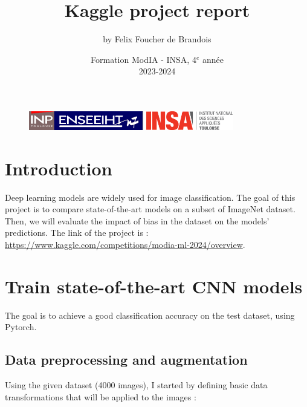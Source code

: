 \documentclass[12pt,a4paper]{article}
\begin{document}
\begin{figure}[ht]
    \centering
    \includegraphics[width=5cm]{src/inp_n7.png}
    \hfill
    \includegraphics[width=3.8cm]{src/insa_toulouse.png}
\end{figure}

\title{\vspace{4cm} \textbf{Kaggle project report}}

\author{by Felix Foucher de Brandois}
        
\date{\vfill Formation ModIA - INSA, 4$^e$ année \\
2023-2024}

\maketitle

\newpage
\tableofcontents
\listoffigures

\newpage


\section{Introduction}
Deep learning models are widely used for image classification.
The goal of this project is to compare state-of-the-art models on a subset of ImageNet dataset.
Then, we will evaluate the impact of bias in the dataset on the models' predictions.
The link of the project is : \url{https://www.kaggle.com/competitions/modia-ml-2024/overview}.


\section{Train state-of-the-art CNN models}

The goal is to achieve a good classification accuracy on the test dataset, using Pytorch.

\subsection{Data preprocessing and augmentation}

Using the given dataset (4000 images), I started by defining basic data transformations that will be applied to the images :
\end{document}

